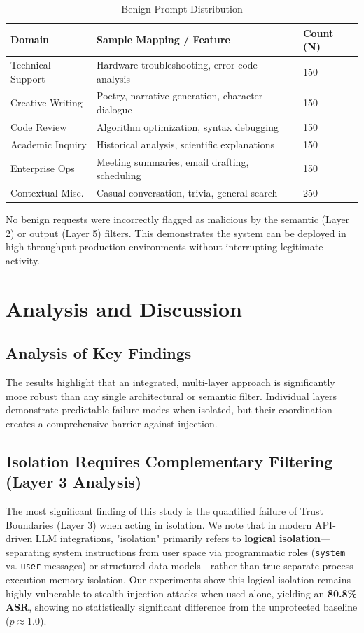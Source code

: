 \documentclass[conference]{IEEEtran}
\begin{document}
\begin{table}[htbp]
\caption{Benign Prompt Distribution}
\begin{center}
\begin{tabularx}{\columnwidth}{@{}l X l@{}}
\toprule
\textbf{Domain} & \textbf{Sample Mapping / Feature} & \textbf{Count (N)} \\ \midrule
Technical Support & Hardware troubleshooting, error code analysis & 150 \\
Creative Writing & Poetry, narrative generation, character dialogue & 150 \\
Code Review & Algorithm optimization, syntax debugging & 150 \\
Academic Inquiry & Historical analysis, scientific explanations & 150 \\
Enterprise Ops & Meeting summaries, email drafting, scheduling & 150 \\
Contextual Misc. & Casual conversation, trivia, general search & 250 \\ \bottomrule
\end{tabularx}
\end{center}
\end{table}

No benign requests were incorrectly flagged as malicious by the semantic (Layer 2) or output (Layer 5) filters. This demonstrates the system can be deployed in high-throughput production environments without interrupting legitimate activity.



\section{Analysis and Discussion}

\subsection{Analysis of Key Findings}
The results highlight that an integrated, multi-layer approach is significantly more robust than any single architectural or semantic filter. Individual layers demonstrate predictable failure modes when isolated, but their coordination creates a comprehensive barrier against injection.

\subsection{Isolation Requires Complementary Filtering (Layer 3 Analysis)}
The most significant finding of this study is the quantified failure of Trust Boundaries (Layer 3) when acting in isolation. We note that in modern API-driven LLM integrations, "isolation" primarily refers to \textbf{logical isolation}—separating system instructions from user space via programmatic roles (\texttt{system} vs. \texttt{user} messages) or structured data models—rather than true separate-process execution memory isolation. Our experiments show this logical isolation remains highly vulnerable to stealth injection attacks when used alone, yielding an \textbf{80.8\% ASR}, showing no statistically significant difference from the unprotected baseline ($p \approx 1.0$).
\end{document}
